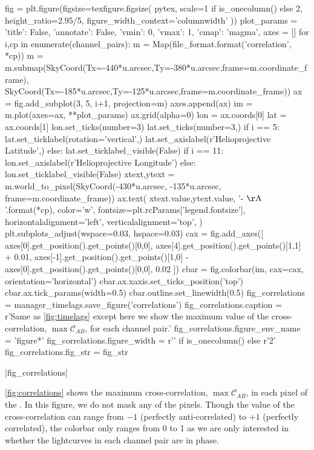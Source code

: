 \begin{pycode}
fig = plt.figure(figsize=texfigure.figsize(
    pytex,
    scale=1 if is_onecolumn() else 2,
    height_ratio=2.95/5,
    figure_width_context='columnwidth'
))
plot_params = {
    'title': False, 
    'annotate': False,
    'vmin': 0,
    'vmax': 1,
    'cmap': 'magma',
}
axes = []
for i,cp in enumerate(channel_pairs):
    m = Map(file_format.format('correlation', *cp))
    m = m.submap(SkyCoord(Tx=-440*u.arcsec,Ty=-380*u.arcsec,frame=m.coordinate_frame),
                 SkyCoord(Tx=-185*u.arcsec,Ty=-125*u.arcsec,frame=m.coordinate_frame))
    ax = fig.add_subplot(3, 5, i+1, projection=m)
    axes.append(ax)
    im = m.plot(axes=ax, **plot_params)
    ax.grid(alpha=0)
    lon = ax.coords[0]
    lat = ax.coords[1]
    lon.set_ticks(number=3)
    lat.set_ticks(number=3,) 
    if i == 5:
        lat.set_ticklabel(rotation='vertical',)
        lat.set_axislabel(r'Helioprojective Latitude',)
    else:
        lat.set_ticklabel_visible(False)
    if i == 11:
        lon.set_axislabel(r'Helioprojective Longitude')
    else:
        lon.set_ticklabel_visible(False)
    xtext,ytext = m.world_to_pixel(SkyCoord(-430*u.arcsec, -135*u.arcsec, frame=m.coordinate_frame))
    ax.text(
        xtext.value,ytext.value,
        '{}-{} $\mathrm{{\AA}}$'.format(*cp),
        color='w',
        fontsize=plt.rcParams['legend.fontsize'],
        horizontalalignment='left',
        verticalalignment='top',
    )
plt.subplots_adjust(wspace=0.03, hspace=0.03)
cax = fig.add_axes([
    axes[0].get_position().get_points()[0,0],
    axes[4].get_position().get_points()[1,1] + 0.01,
    axes[-1].get_position().get_points()[1,0] - axes[0].get_position().get_points()[0,0], 
    0.02
])
cbar = fig.colorbar(im, cax=cax, orientation='horizontal')
cbar.ax.xaxis.set_ticks_position('top')
cbar.ax.tick_params(width=0.5)
cbar.outline.set_linewidth(0.5)
fig_correlations = manager_timelags.save_figure('correlations')
fig_correlations.caption = r'Same as \autoref{fig:timelags} except here we show the maximum value of the cross-correlation, $\max\mathcal{C}_{AB}$, for each channel pair.'
fig_correlations.figure_env_name = 'figure*'
fig_correlations.figure_width = r'\columnwidth' if is_onecolumn() else r'2\columnwidth'
fig_correlations.fig_str = fig_str
\end{pycode}
|fig_correlations|

\autoref{fig:correlations} shows the maximum cross-correlation, $\max\mathcal{C}_{AB}$, in each pixel of the \AR{}. In this figure, we do not mask any of the pixels. Though the value of the cross-correlation can range from $-1$ (perfectly anti-correlated) to $+1$ (perfectly correlated), the colorbar only ranges from 0 to 1 as we are only interested in whether the lightcurves in each channel pair are in phase.

